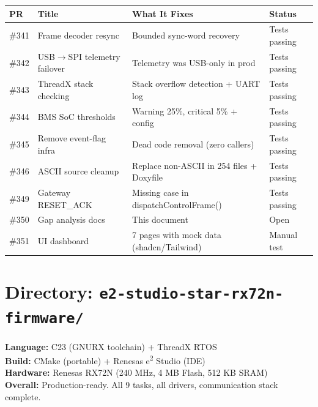\documentclass[12pt,a4paper]{article}
\begin{document}
\begin{center}
\small
\begin{tabular}{L{1.3cm}L{4.8cm}L{5.1cm}L{2.5cm}}
  \toprule
  \textbf{PR} & \textbf{Title} & \textbf{What It Fixes} & \textbf{Status} \\
  \midrule
  \#341 & Frame decoder resync & Bounded sync-word recovery & Tests passing \\
  \#342 & USB$\to$SPI telemetry failover & Telemetry was USB-only in prod & Tests passing \\
  \#343 & ThreadX stack checking & Stack overflow detection + UART log & Tests passing \\
  \#344 & BMS SoC thresholds & Warning 25\%, critical 5\% + config & Tests passing \\
  \#345 & Remove event-flag infra & Dead code removal (zero callers) & Tests passing \\
  \#346 & ASCII source cleanup & Replace non-ASCII in 254 files + Doxyfile & Tests passing \\
  \#349 & Gateway RESET\_ACK & Missing case in dispatchControlFrame() & Tests passing \\
  \#350 & Gap analysis docs & This document & Open \\
  \#351 & UI dashboard & 7 pages with mock data (shadcn/Tailwind) & Manual test \\
  \bottomrule
\end{tabular}
\end{center}

\newpage

\section{Directory: \texttt{e2-studio-star-rx72n-firmware/}}

\begin{dirbox}
  \textbf{Language:} C23 (GNURX toolchain) + ThreadX RTOS\\
  \textbf{Build:} CMake (portable) + Renesas e\textsuperscript{2} Studio (IDE)\\
  \textbf{Hardware:} Renesas RX72N (240 MHz, 4 MB Flash, 512 KB SRAM)\\
  \textbf{Overall:} Production-ready. All 9 tasks, all drivers, communication stack complete.
\end{dirbox}
\end{document}
